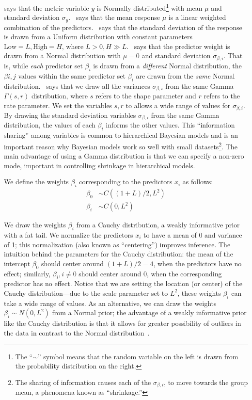  says that the metric variable $y$ is Normally distributed\footnote{The ``$\sim$'' symbol means that the random variable on the left is drawn from the probability distribution on the right.} with mean $\mu$ and standard deviation $\sigma_y$.~ says that the mean response $\mu$ is a linear weighted combination of the predictors.~ says that the standard deviation of the response is drawn from a Uniform distribution with constant parameters $\text{Low}=L, \text{High}=H$, where $L>0, H\gg L$.~ says that the predictor weight is drawn from a Normal distribution with $\mu=0$ and standard deviation $\sigma_{\beta, i}$. That is,  while \textit{each} predictor set $\beta_{i}$ is drawn from a \textit{different} Normal distribution, the $\beta{i,j}$ values within the same predictor set $\beta_{i}$ are drawn from the \textit{same} Normal distribution.~ says that we draw all the variances $\sigma_{\beta, i}$ from the same Gamma $\Gamma(s,r)$ distribution, where $s$ refers to the shape parameter and $r$ refers to the rate parameter. We set the variables $s,r$ to allows a wide range of values for $\sigma_{\beta, i}$. By drawing the standard deviation variables $\sigma_{\beta, i}$ from the same Gamma distribution, the values of each $\beta_i$ informs the other values. This ``information sharing'' among variables is common to hierarchical Bayesian models and is an important reason why Bayesian models work so well with small datasets\footnote{The sharing of information causes each of the $\sigma_{\beta, i}$, to move towards the group mean, a phenomena known as ``shrinkage.'' }. The main advantage of using a Gamma distribution is that we can specify a non-zero mode, important in controlling shrinkage in hierarchical models.

We define the weights $\beta_i$ corresponding to the predictors $x_i$ as follows:
\begin{align}
 \beta_0 & \sim C((1+L)/2, L^2) \\
 \beta_i & \sim  C(0, L^2)
\end{align}

We draw the weights $\beta_i$ from a Cauchy distribution, a weakly informative prior with a fat tail. We normalize the predictors $x_i$ to have a mean of 0 and variance of 1; this normalization (also known as ``centering'') improves inference. The intuition behind the parameters for the Cauchy distribution: the mean of the intercept $\beta_0$ should center around $(1+L)/2=4$, when the predictors have no effect; similarly, $\beta_i, i\neq 0$ should center around 0, when the corresponding predictor has no effect. Notice that we are setting the location (or center) of the Cauchy distribution---due to the scale parameter set to $L^2$, these weights $\beta_i$ can take a wide range of values. As an alternative, we can draw the weights $\beta_i \sim N(0, L^2)$ from a Normal prior; the advantage of a weakly informative prior like the Cauchy distribution is that it allows for greater possibility of outliers in the data in contrast to the Normal distribution~\cite{Kay2016}.

